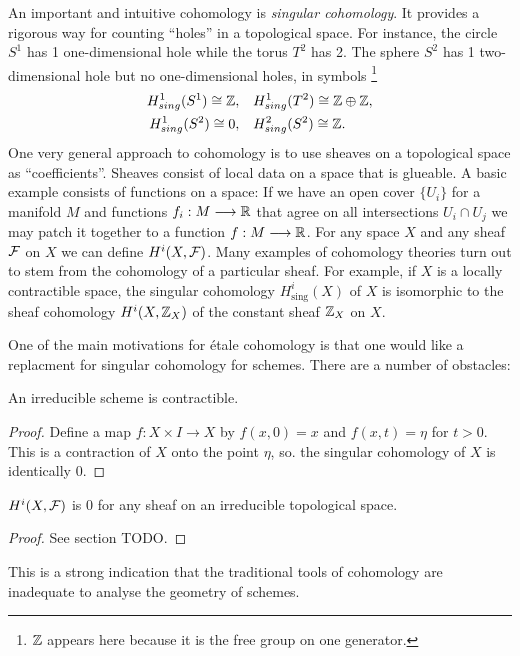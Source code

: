 An important and intuitive cohomology is \textit{singular cohomology}. It provides a rigorous way for counting ``holes'' in a topological space.  For instance, the circle $S^1$ has 1 one-dimensional hole while the torus $T^2$ has 2. The sphere $S^2$ has 1 two-dimensional hole but no one-dimensional holes, in symbols 
\footnote{$\mathbb{Z}$ appears here because it is the free group on one generator.}
\begin{align*}
  H^1_{sing}(S^1) \cong \mathbb{Z},\quad &H^1_{sing}(T^2) \cong \mathbb{Z} \oplus \mathbb{Z},\\
  H^1_{sing}(S^2) \cong  0,\quad &H^2_{sing}(S^2) \cong \mathbb{Z}.
\end{align*}
One very general approach to cohomology is to use sheaves on a topological space as ``coefficients''. Sheaves consist of local data on a space that is glueable. A basic example consists of functions on a space: If we have an open cover $\{ U_i\}$ for a manifold $M$ and functions $f_i: M \longrightarrow \mathbb{R}$ that agree on all intersections $U_i \cap U_j$ we may patch it together to a function $f: M \longrightarrow \mathbb{R}$.
 For any space $X$ and any sheaf $\mathcal{F}$ on $X$ we can define $H^i(X, \mathcal{F})$. Many examples of cohomology theories turn out to stem from the cohomology of a particular sheaf. For example, if $X$ is a locally contractible space, the singular cohomology $H_{\text{sing}}^i(X)$ of $X$ is isomorphic to the sheaf cohomology $H^i(X, \mathbb{Z}_X)$ of the constant sheaf $\mathbb{Z}_X$ on $X$.

One of the main motivations for \'etale cohomology is that one would like a replacment for singular cohomology for schemes. There are a number of obstacles:
\begin{proposition}\label{scheme_contractible}
    An irreducible scheme is contractible.
\end{proposition}
\begin{proof}
  Define a map $f: X \times I \to X$  by $f(x,0) = x$ and $f(x,t) = \eta$ for $t > 0$. This is a contraction of $X$ onto the point $\eta$, so. the singular cohomology of $X$ is identically 0.
\end{proof}

\begin{proposition}
  $H^i(X, \mathcal{F})$ is 0 for any sheaf on an irreducible topological space.
\end{proposition}
\begin{proof}
    See section TODO.
\end{proof}
This is a strong indication that the traditional tools of cohomology are inadequate to analyse the geometry of schemes.


